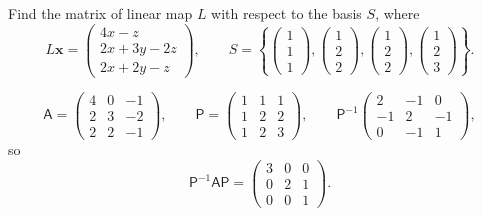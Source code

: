 \documentclass[10pt,notitlepage]{revtex4-1}
\newenvironment{example}[1][Example]{\begin{trivlist}
\item[\hskip \labelsep {\bfseries #1}]}{\end{trivlist}}
\newcommand{\xb}{\boldsymbol{x}}
\begin{document}
\begin{example}
	Find the matrix of linear map $L$ with respect to the basis $S$, where
	\begin{equation}
		L\xb=\begin{pmatrix}4x-z\\2x+3y-2z\\2x+2y-z\end{pmatrix},\qquad
		S=\left\{\begin{pmatrix}1\\1\\1\end{pmatrix},
		\begin{pmatrix}1\\2\\2\end{pmatrix},\begin{pmatrix}1\\2\\2\end{pmatrix},
		\begin{pmatrix}1\\2\\3\end{pmatrix}\right\}.
	\end{equation}	
	
	\begin{equation}
		\mathsf{A}=\begin{pmatrix}4&0&-1\\2&3&-2\\2&2&-1\end{pmatrix},\qquad
		\mathsf{P}=\begin{pmatrix}1&1&1\\1&2&2\\1&2&3\end{pmatrix},\qquad
		\mathsf{P}^{-1}\begin{pmatrix}2&-1&0\\-1&2&-1\\0&-1&1\end{pmatrix},
	\end{equation}
	so
	\begin{equation}
		\mathsf{P}^{-1}\mathsf{A}\mathsf{P}=
		\begin{pmatrix}3&0&0\\0&2&1\\0&0&1\end{pmatrix}.
	\end{equation}
\end{example}
\end{document}
